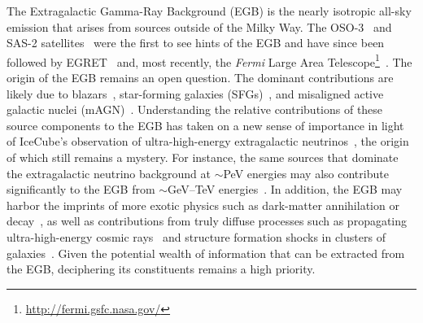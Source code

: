 The Extragalactic Gamma-Ray Background (EGB) is the nearly isotropic all-sky emission that arises from sources outside of the Milky Way.  The OSO-3~\cite{1968ApJ...153L.203C, 1972ApJ...177..341K} and SAS-2 satellites~\cite{1975ApJ...198..163F,1978ApJ...222..833F} were the first to see hints of the EGB and have since been followed by EGRET~\cite{1998ApJ...494..523S,2004ApJ...613..956S} and, most recently, the \emph{Fermi} Large Area Telescope\footnote{\url{http://fermi.gsfc.nasa.gov/}}~\cite{Ackermann:2014usa,TheFermi-LAT:2015ykq}.  The origin of the EGB remains an open question.  The dominant contributions are likely due to blazars~\cite{Stecker:1993ni, Stecker:1996ma, Muecke:1998cs, Narumoto:2006qg,Dermer:2007fg, Pavlidou:2007dv, Ajello:2009ip, Collaboration:2010gqa, Abazajian:2010pc,  Stecker:2010di,Singal:2011yi,  Ajello:2011zi, Ajello:2013lka,DiMauro:2013zfa, Ajello:2015mfa, Ackermann:2015uya}, star-forming galaxies (SFGs)~\cite{Soltan:1998jg,Pavlidou:2002va, Bhattacharya:2009yv, Ando:2009nk, Fields:2010bw, Makiya:2010zt, Ackermann:2012vca, Chakraborty:2012sh, Lacki:2012si, Tamborra:2014xia}, and misaligned active galactic nuclei (mAGN)~\cite{Stawarz:2005tq, Inoue:2011bm, Massaro:2011ww, DiMauro:2013xta, Hooper:2016gjy}.  Understanding the relative contributions of these source components to the EGB has taken on a new sense of importance in light of IceCube's observation of ultra-high-energy extragalactic neutrinos~\cite{Aartsen:2013bka,Aartsen:2013jdh,Aartsen:2015knd,Aartsen:2015rwa}, the origin of which still remains a mystery.  For instance, the same sources that dominate the extragalactic neutrino background at $\sim$PeV energies may also contribute significantly to the EGB from $\sim$GeV--TeV energies~\cite{Murase:2013rfa, Tamborra:2014xia,Hooper:2016gjy}.  In addition, the EGB may harbor the imprints of more exotic physics such as dark-matter annihilation or decay~\cite{Bengtsson:1990xf,Bergstrom:2001jj,Ullio:2002pj,Bottino:2004qi,Bertone:2004pz,Bringmann:2012ez,Ajello:2015mfa, DiMauro:2015tfa, Ackermann:2015tah}, as well as contributions from truly diffuse processes such as propagating ultra-high-energy cosmic rays~\cite{Loeb:2000aa,Kalashev:2007sn,Ahlers:2011sd,Murase:2012df,Taylor:2015rla} and structure formation shocks in clusters of galaxies~\cite{Murase:2008yt,Zandanel:2014pva}.
Given the potential wealth of information that can be extracted from the EGB, deciphering its constituents remains a high priority.     

